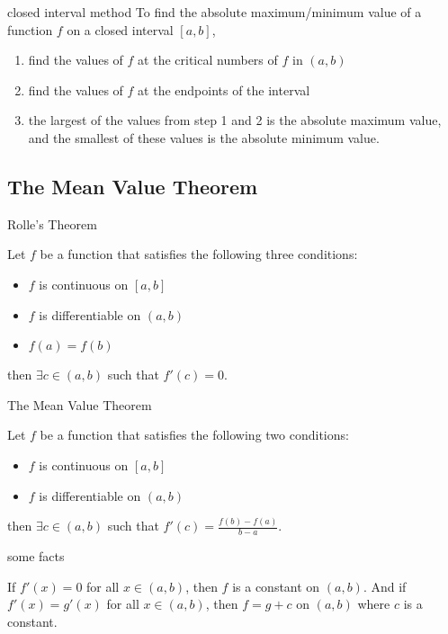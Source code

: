 \documentclass[Calculus 1 Recitation.tex]{subfiles}
\begin{document}
\begin{myleftlinebox}
	closed interval method
	\tcblower
	To find the absolute maximum/minimum value of a function $f$ on a closed interval $[a,b]$,
	\begin{enumerate}
		\item find the values of $f$ at the critical numbers of $f$ in $(a,b)$
		\item find the values of $f$ at the endpoints of the interval
		\item the largest of the values from step 1 and 2 is the absolute maximum value, and the smallest of these values is the absolute minimum value.
	\end{enumerate}
\end{myleftlinebox}

\subsection{The Mean Value Theorem}

\begin{myleftlinebox}
	Rolle's Theorem
	\tcblower
	\begin{theorem}
		Let $f$ be a function that satisfies the following three conditions:
		\begin{itemize}
			\item $f$ is continuous on $[a,b]$
			\item $f$ is differentiable on $(a,b)$
			\item $f(a)=f(b)$
		\end{itemize}
		then $\exists c\in(a,b)$ such that $f'(c)=0$.
	\end{theorem}
\end{myleftlinebox}

\begin{myleftlinebox}
	The Mean Value Theorem
	\tcblower
	\begin{theorem}
		Let $f$ be a function that satisfies the following two conditions:
		\begin{itemize}
			\item $f$ is continuous on $[a,b]$
			\item $f$ is differentiable on $(a,b)$
		\end{itemize}
		then $\exists c\in(a,b)$ such that $f'(c)=\frac{f(b)-f(a)}{b-a}$.
	\end{theorem}
\end{myleftlinebox}

\begin{myleftlinebox}
	some facts
	\tcblower
	\begin{proposition}
		If $f'(x)=0$ for all $x\in(a,b)$, then $f$ is a constant on $(a,b)$. And if $f'(x)=g'(x)$ for all $x\in(a,b)$, then $f=g+c$ on $(a,b)$ where $c$ is a constant.
	\end{proposition}
\end{myleftlinebox}
\end{document}
